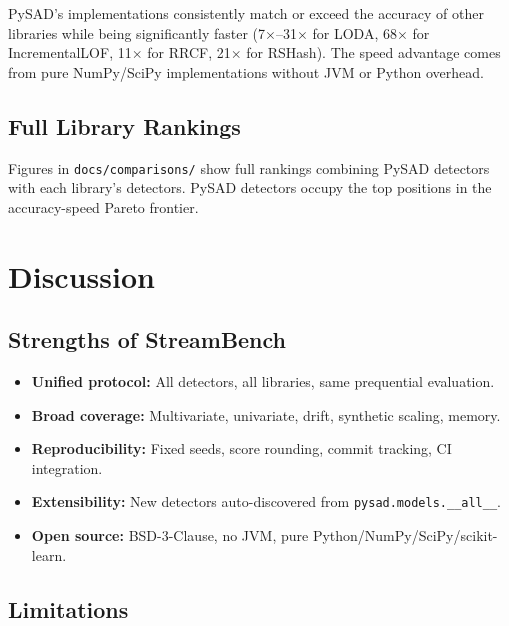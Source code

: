 \documentclass[11pt,a4paper]{article}
\begin{document}
PySAD's implementations consistently match or exceed the accuracy of other libraries while being significantly faster (7$\times$--31$\times$ for LODA, 68$\times$ for IncrementalLOF, 11$\times$ for RRCF, 21$\times$ for RSHash). The speed advantage comes from pure NumPy/SciPy implementations without JVM or Python overhead.

\subsection{Full Library Rankings}
\label{sec:full_rankings}

Figures in \texttt{docs/comparisons/} show full rankings combining PySAD detectors with each library's detectors. PySAD detectors occupy the top positions in the accuracy-speed Pareto frontier.

\section{Discussion}
\label{sec:discussion}

\subsection{Strengths of StreamBench}
\label{sec:strengths}

\begin{itemize}
    \item \textbf{Unified protocol:} All detectors, all libraries, same prequential evaluation.
    \item \textbf{Broad coverage:} Multivariate, univariate, drift, synthetic scaling, memory.
    \item \textbf{Reproducibility:} Fixed seeds, score rounding, commit tracking, CI integration.
    \item \textbf{Extensibility:} New detectors auto-discovered from \texttt{pysad.models.\_\_all\_\_}.
    \item \textbf{Open source:} BSD-3-Clause, no JVM, pure Python/NumPy/SciPy/scikit-learn.
\end{itemize}

\subsection{Limitations}
\label{sec:limitations}
\end{document}
